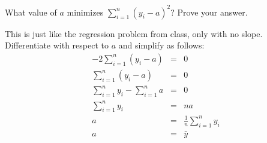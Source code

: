 \documentclass[addpoints,12pt]{exam}
\begin{document}
\begin{questions}
	
\question What value of $a$ minimizes $\sum_{i=1}^n (y_i - a)^2$? Prove your answer. 
		\begin{solution}
			This is just like the regression problem from class, only with no slope. Differentiate with respect to $a$ and simplify as follows:
				\begin{eqnarray*}
					-2 \sum_{i=1}^n (y_i - a) &=& 0\\
					\sum_{i=1}^n (y_i - a) &=& 0\\
					\sum_{i=1}^n y_i - \sum_{i=1}^n a &=& 0\\
					\sum_{i=1}^n y_i  &=& na\\
					a &=& \frac{1}{n} \sum_{i=1}^n y_i\\
					a&=& \bar{y}
				\end{eqnarray*}
		\end{solution}
		

\end{questions}
\end{document}

